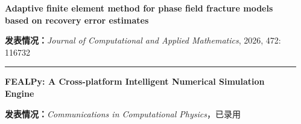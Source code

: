 \documentclass[notheorems]{beamer}
\begin{document}
\begin{frame}
\begin{columns}[T, totalwidth=\linewidth]
\begin{column}{0.50\linewidth}
\begin{tcolorbox}
				\end{tcolorbox}
			\end{column}
			
			\begin{column}{0.47\linewidth}
				\begin{tcolorbox}[
					colback=white, colframe=structure.fg!50,
					colbacktitle=structure.fg, coltitle=white,
					fonttitle=\fontsize{7.5}{10}\selectfont\bfseries\sffamily,
					title={\circnum{02}\enspace 合作论文成果（本人参与）},
					arc=3pt, boxrule=0.5pt,
					toptitle=2pt, bottomtitle=2pt,
					top=7pt, bottom=7pt, left=7pt, right=7pt,
					height=0.60\paperheight, valign=top]
					\setlength{\parskip}{0pt}
					
					{\fontsize{7.5}{12}\selectfont\sffamily\bfseries
						Adaptive finite element method for phase field
						fracture models based on recovery error estimates\par}
					
					{\fontsize{7}{10.5}\selectfont\sffamily
						\textbf{发表情况：}\textit{Journal of Computational and Applied Mathematics}, 2026, 472: 116732}
					
					\vspace{-4pt}
					{\color{structure.fg!25}\rule{\linewidth}{0.4pt}}
					\vspace{-8pt}
					
					{\fontsize{7.5}{12}\selectfont\sffamily\bfseries
						FEALPy: A Cross-platform Intelligent Numerical
						Simulation Engine\par}
					
					{\fontsize{7}{10.5}\selectfont\sffamily
						\textbf{发表情况：}\textit{Communications in Computational Physics}，已录用}
					
				\end{tcolorbox}
			\end{column}
			
		\end{columns}
		
	\end{frame}
	
\end{document}
